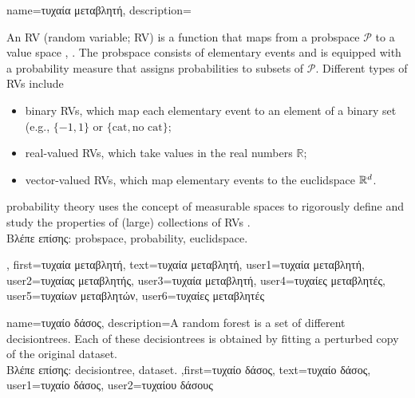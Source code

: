 {name={\foreignlanguage{greek}{τυχαία μεταβλητή}},
 description={An RV (random variable; RV) is a function that maps from 
 	a \gls{probspace} $\mathcal{P}$ to a value space \cite{GrayProbBook}, \cite{BillingsleyProbMeasure}. 
 	The \gls{probspace} consists of elementary events and is equipped with a \gls{probability} 
 	measure that assigns probabilities to subsets of $\mathcal{P}$. 
 	Different types of RVs include  
 	\begin{itemize} 
 	\item {binary RVs}, which map each elementary event to an element of a binary set (e.g., $\{-1,1\}$ or $\{\text{cat}, \text{no cat}\}$; 
 	\item {real-valued RVs}, which take values in the real numbers $\mathbb{R}$;  
 	\item {vector-valued RVs}, which map elementary events to the \gls{euclidspace} $\mathbb{R}^{d}$.  
 	\end{itemize} 
 	\Gls{probability} theory uses the concept of measurable spaces to rigorously define 
 	and study the properties of (large) collections of RVs \cite{BillingsleyProbMeasure}.\\
	\foreignlanguage{greek}{Βλέπε επίσης:} \gls{probspace}, \gls{probability}, \gls{euclidspace}.
	}, first={\foreignlanguage{greek}{τυχαία μεταβλητή}},
	text={\foreignlanguage{greek}{τυχαία μεταβλητή}},
	user1={\foreignlanguage{greek}{τυχαία μεταβλητή}}, %
	user2={\foreignlanguage{greek}{τυχαίας μεταβλητής}}, %
	user3={\foreignlanguage{greek}{τυχαία μεταβλητή}}, %
	user4={\foreignlanguage{greek}{τυχαίες μεταβλητές}}, %
	user5={\foreignlanguage{greek}{τυχαίων μεταβλητών}}, %
	user6={\foreignlanguage{greek}{τυχαίες μεταβλητές}} %
}

{name={\foreignlanguage{greek}{τυχαίο δάσος}},
	description={A random forest is a set of different \gls{decisiontree}s. 
		Each of these \gls{decisiontree}s is obtained by fitting a perturbed copy of 
		the original \gls{dataset}.\\
		\foreignlanguage{greek}{Βλέπε επίσης:} \gls{decisiontree}, \gls{dataset}.
		},first={\foreignlanguage{greek}{τυχαίο δάσος}}, 
		text={\foreignlanguage{greek}{τυχαίο δάσος}},
		user1={\foreignlanguage{greek}{τυχαίο δάσος}}, %
		user2={\foreignlanguage{greek}{τυχαίου δάσους}} %
}

